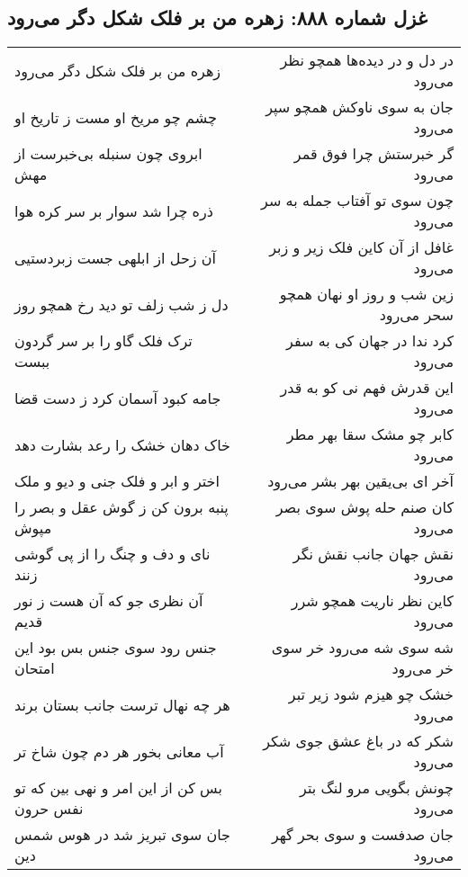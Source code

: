 \begin{center}
\section*{غزل شماره ۸۸۸: زهره من بر فلک شکل دگر می‌رود}
\label{sec:0888}
\begin{longtable}{l p{0.5cm} r}
زهره من بر فلک شکل دگر می‌رود
&&
در دل و در دیده‌ها همچو نظر می‌رود
\\
چشم چو مریخ او مست ز تاریخ او
&&
جان به سوی ناوکش همچو سپر می‌رود
\\
ابروی چون سنبله بی‌خبرست از مهش
&&
گر خبرستش چرا فوق قمر می‌رود
\\
ذره چرا شد سوار بر سر کره هوا
&&
چون سوی تو آفتاب جمله به سر می‌رود
\\
آن زحل از ابلهی جست زبردستیی
&&
غافل از آن کاین فلک زیر و زبر می‌رود
\\
دل ز شب زلف تو دید رخ همچو روز
&&
زین شب و روز او نهان همچو سحر می‌رود
\\
ترک فلک گاو را بر سر گردون ببست
&&
کرد ندا در جهان کی به سفر می‌رود
\\
جامه کبود آسمان کرد ز دست قضا
&&
این قدرش فهم نی کو به قدر می‌رود
\\
خاک دهان خشک را رعد بشارت دهد
&&
کابر چو مشک سقا بهر مطر می‌رود
\\
اختر و ابر و فلک جنی و دیو و ملک
&&
آخر ای بی‌یقین بهر بشر می‌رود
\\
پنبه برون کن ز گوش عقل و بصر را مپوش
&&
کان صنم حله پوش سوی بصر می‌رود
\\
نای و دف و چنگ را از پی گوشی زنند
&&
نقش جهان جانب نقش نگر می‌رود
\\
آن نظری جو که آن هست ز نور قدیم
&&
کاین نظر ناریت همچو شرر می‌رود
\\
جنس رود سوی جنس بس بود این امتحان
&&
شه سوی شه می‌رود خر سوی خر می‌رود
\\
هر چه نهال ترست جانب بستان برند
&&
خشک چو هیزم شود زیر تبر می‌رود
\\
آب معانی بخور هر دم چون شاخ تر
&&
شکر که در باغ عشق جوی شکر می‌رود
\\
بس کن از این امر و نهی بین که تو نفس حرون
&&
چونش بگویی مرو لنگ بتر می‌رود
\\
جان سوی تبریز شد در هوس شمس دین
&&
جان صدفست و سوی بحر گهر می‌رود
\\
\end{longtable}
\end{center}
